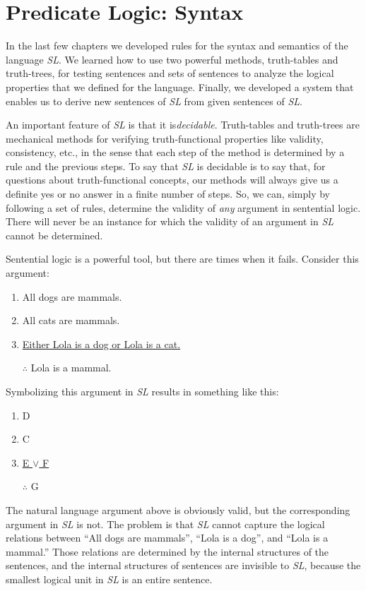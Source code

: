 \documentclass[../logic-text.tex]{subfiles}
\begin{document}
\chapter{Predicate Logic: Syntax}
\label{cha:pl-syntax}

In the last few chapters we developed rules for the syntax and semantics of the language \emph{SL}. We learned how to use two powerful methods, truth-tables and truth-trees, for testing sentences and sets of sentences to analyze the logical properties that we defined for the language.  Finally, we developed a system that enables us to derive new sentences of \emph{SL} from given sentences of \emph{SL}.

An important feature of \emph{SL} is that it is\emph{decidable}. Truth-tables and truth-trees are mechanical methods for verifying truth-functional properties like validity, consistency, etc., in the sense that each step of the method is determined by a rule and the previous steps. To say that \emph{SL} is decidable is to say that, for questions about truth-functional concepts, our methods will always give us a definite yes or no answer in a finite number of steps. So, we can, simply by following a set of rules, determine the validity of \emph{any} argument in sentential logic. There will never be an instance for which the validity of an argument in \emph{SL} cannot be determined.

Sentential logic is a powerful tool, but there are times when it fails. Consider this argument:

\begin{enumerate}
  \item All dogs are mammals.
  \item All cats are mammals.
  \item \underline{Either Lola is a dog or Lola is a cat.}
  \item [$\therefore$] Lola is a mammal.
\end{enumerate}


\noindent Symbolizing this argument in \emph{SL} results in something like this:

\begin{enumerate}
  \item D
  \item C
  \item \underline{E \(\lor\) F}
  \item [$\therefore$] G
\end{enumerate}

The natural language argument above is obviously valid, but the corresponding argument in \emph{SL} is not. The problem is that \emph{SL} cannot capture the logical relations between \enquote{All dogs are mammals}, \enquote{Lola is a dog}, and \enquote{Lola is a mammal.} Those relations are determined by the internal structures of the sentences, and the internal structures of sentences are invisible to \emph{SL}, because the smallest logical unit in \emph{SL} is an entire sentence.
\end{document}
